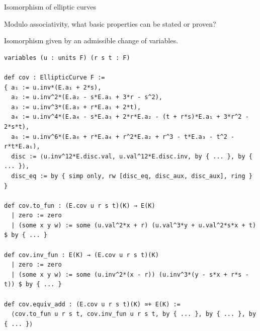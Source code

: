 \documentclass[10pt]{beamer}
\begin{document}
\begin{frame}[fragile, t]{Isomorphism of elliptic curves}

Modulo associativity, what basic properties can be stated or proven?

\vspace{0.5cm}

Isomorphism given by an admissible change of variables.

\begin{lstlisting}[basicstyle=\scriptsize, frame=single]
variables (u : units F) (r s t : F)

def cov : EllipticCurve F :=
{ a₁ := u.inv*(E.a₁ + 2*s),
  a₂ := u.inv^2*(E.a₂ - s*E.a₁ + 3*r - s^2),
  a₃ := u.inv^3*(E.a₃ + r*E.a₁ + 2*t),
  a₄ := u.inv^4*(E.a₄ - s*E.a₃ + 2*r*E.a₂ - (t + r*s)*E.a₁ + 3*r^2 - 2*s*t),
  a₆ := u.inv^6*(E.a₆ + r*E.a₄ + r^2*E.a₂ + r^3 - t*E.a₃ - t^2 - r*t*E.a₁),
  disc := ⟨u.inv^12*E.disc.val, u.val^12*E.disc.inv, by { ... }, by { ... }⟩,
  disc_eq := by { simp only, rw [disc_eq, disc_aux, disc_aux], ring } }

def cov.to_fun : (E.cov u r s t)(K) → E(K)
  | zero := zero
  | (some x y w) := some (u.val^2*x + r) (u.val^3*y + u.val^2*s*x + t) $ by { ... }

def cov.inv_fun : E(K) → (E.cov u r s t)(K)
  | zero := zero
  | (some x y w) := some (u.inv^2*(x - r)) (u.inv^3*(y - s*x + r*s - t)) $ by { ... }

def cov.equiv_add : (E.cov u r s t)(K) ≃+ E(K) :=
  ⟨cov.to_fun u r s t, cov.inv_fun u r s t, by { ... }, by { ... }, by { ... }⟩
\end{lstlisting}

\end{frame}
\end{document}

